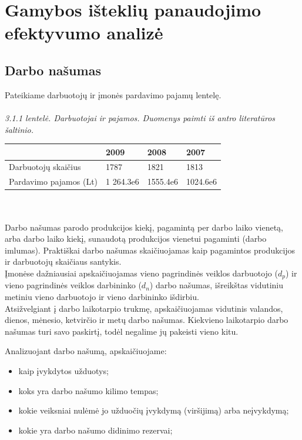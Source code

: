 \documentclass[11pt,a4paper]{article}
\begin{document}
\section{Gamybos išteklių panaudojimo efektyvumo analizė}
\subsection{Darbo našumas}

Pateikiame darbuotojų ir įmonės pardavimo pajamų lentelę.\\\\
\textsl{3.1.1 lentelė. Darbuotojai ir pajamos. Duomenys paimti iš antro literatūros šaltinio.}\\
\begin{tabular}{|p{5cm}|p{3cm}|p{3cm}|p{3cm}|} \hline
		&	2009 & 2008 & 2007 \\ \hline
	Darbuotojų skaičius 		& 1787 & 1821 & 1813 \\ \hline
	Pardavimo pajamos (Lt)	& 1 264.3e6 & 1555.4e6 & 1024.6e6 \\ \hline 
\end{tabular}\\\\

Darbo našumas parodo produkcijos kiekį, pagamintą per darbo laiko vienetą, arba darbo laiko kiekį, sunaudotą produkcijos vienetui pagaminti 
(darbo imlumas). Praktiškai darbo našumas skaičiuojamas kaip pagamintos produkcijos ir darbuotojų skaičiaus santykis.\\

Įmonėse dažniausiai apskaičiuojamas vieno pagrindinės veiklos darbuotojo ($d_p$) ir vieno pagrindinės veiklos darbininko ($d_n$) darbo 
našumas, išreikštas vidutiniu metiniu vieno darbuotojo ir vieno darbininko išdirbiu.\\

Atsižvelgiant į darbo laikotarpio trukmę, apskaičiuojamas vidutinis valandos,  dienos, mėnesio, ketvirčio ir metų darbo našumas. Kiekvieno 
laikotarpio darbo našumas turi savo paskirtį, todėl negalime jų pakeisti vieno kitu.

Analizuojant darbo našumą, apskaičiuojame:
\begin{itemize}
	\item kaip įvykdytos užduotys;
	\item koks yra darbo našumo kilimo tempas;
	\item kokie veiksniai nulėmė jo užduočių įvykdymą (viršijimą) arba neįvykdymą;
	\item kokie yra darbo našumo didinimo rezervai;
\end{itemize}
\end{document}
